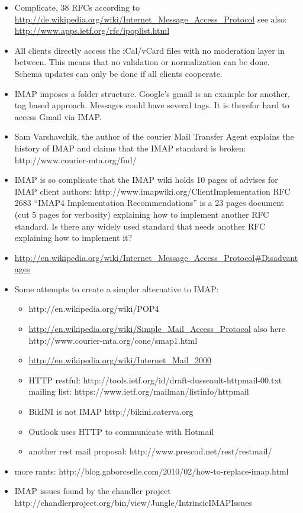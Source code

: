 \documentclass[12pt,a4paper]{scrartcl}		%
\begin{document}
\begin{itemize}
\item Complicate, 38 RFCs according to \url{http://de.wikipedia.org/wiki/Internet_Message_Access_Protocol} see also: \url{http://www.apps.ietf.org/rfc/ipoplist.html}
\item All clients directly access the iCal/vCard files with no moderation layer in between. This means that no validation or normalization can be done. Schema updates can only be done if all clients cooperate.
\item IMAP imposes a folder structure. Google's gmail is an example for another, tag based approach. Messages could have several tags. It is therefor hard to access Gmail via IMAP.
\item Sam Varshavchik, the author of the courier Mail Transfer Agent explains the history of IMAP and claims that the IMAP standard is broken: http://www.courier-mta.org/fud/
\item IMAP is so complicate that the IMAP wiki holds 10 pages of advises for IMAP client authors: http://www.imapwiki.org/ClientImplementation RFC 2683 ``IMAP4 Implementation Recommendations'' is a 23 pages document (cut 5 pages for verbosity) explaining how to implement another RFC standard. Is there any widely used standard that needs another RFC explaining how to implement it?
\item \url{http://en.wikipedia.org/wiki/Internet_Message_Access_Protocol#Disadvantages}
\item Some attempts to create a simpler alternative to IMAP:
  \begin{itemize}
  \item http://en.wikipedia.org/wiki/POP4
  \item \url{http://en.wikipedia.org/wiki/Simple_Mail_Access_Protocol} also here http://www.courier-mta.org/cone/smap1.html
  \item \url{http://en.wikipedia.org/wiki/Internet_Mail_2000}
  \item HTTP restful: http://tools.ietf.org/id/draft-dusseault-httpmail-00.txt mailing list: https://www.ietf.org/mailman/listinfo/httpmail
  \item BikINI is not IMAP http://bikini.caterva.org
  \item Outlook uses HTTP to communicate with Hotmail
  \item another rest mail proposal: http://www.prescod.net/rest/restmail/
  \end{itemize}
\item more rants: http://blog.gaborcselle.com/2010/02/how-to-replace-imap.html
\item IMAP issues found by the chandler project http://chandlerproject.org/bin/view/Jungle/IntrinsicIMAPIssues
\end{itemize}
\end{document}
